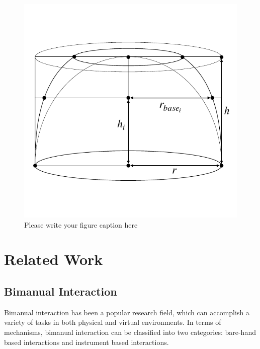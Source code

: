 \begin{figure}
  \includegraphics{f1.pdf}
\caption{Please write your figure caption here}
\label{fig:1}       %
\end{figure}


\section{Related Work}
\label{sec:2}

\subsection{Bimanual Interaction}
\label{sec:2.1}
Bimanual interaction has been a popular research field, which can accomplish a variety of tasks in both physical and virtual environments.
In terms of mechanisms, bimanual interaction can be classified into two categories: bare-hand based interactions and instrument based interactions.

